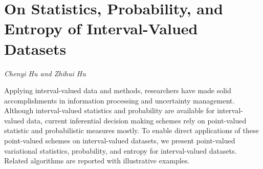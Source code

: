 \documentclass[../booklet.tex]{subfiles}
\begin{document}
\section[On Statistics, Probability, and Entropy of Interval-Valued Datasets. {\it Chenyi Hu and Zhihui Hu}]{On Statistics, Probability, and Entropy of Interval-Valued Datasets}
 

\begin{center}
  {\it Chenyi Hu and Zhihui Hu}
\end{center}

\vskip 0.8cm


Applying interval-valued data and methods, researchers have made solid accomplishments in  information processing and  uncertainty management. Although interval-valued statistics and probability are available for interval-valued data, current inferential decision making schemes rely on point-valued statistic and probabilistic measures mostly.  To enable direct applications of these point-valued schemes on interval-valued datasets, we present point-valued variational statistics, probability, and entropy for interval-valued datasets.  Related algorithms are reported with illustrative examples.  
\end{document}
